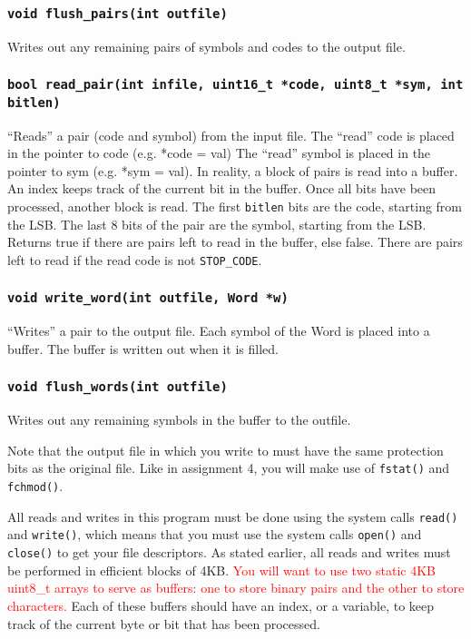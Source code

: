 \documentclass{article}
\begin{document}
\subsubsection{\texttt{void flush\_pairs(int outfile)}}
Writes out any remaining pairs of symbols and codes to the output file.

\subsubsection{\texttt{bool read\_pair(int infile, uint16\_t *code,
uint8\_t *sym, int bitlen)}}
``Reads'' a pair (code and symbol) from the input file.
The ``read'' code is placed in the pointer to code (e.g. *code = val)
The ``read'' symbol is placed in the pointer to sym (e.g. *sym = val).
In reality, a block of pairs is read into a buffer.  An index keeps
track of the current bit in the buffer.  Once all bits have been
processed, another block is read.  The first \texttt{bitlen} bits are
the code, starting from the LSB.  The last 8 bits of the pair are the
symbol, starting from the LSB.  Returns true if there are pairs left to
read in the buffer, else false.  There are pairs left to read if the
read code is not \texttt{STOP\_CODE}.

\subsubsection{\texttt{void write\_word(int outfile, Word *w)}}
``Writes'' a pair to the output file. Each symbol of the Word is placed
into a buffer. The buffer is written out when it is filled.

\subsubsection{\texttt{void flush\_words(int outfile)}}
Writes out any remaining symbols in the buffer to the outfile.

Note that the output file in which you write to must have the same
protection bits as the original file. Like in assignment 4, you will
make use of \texttt{fstat()} and \texttt{fchmod()}.

All reads and writes in this program must be done using the system calls
\texttt{read()} and \texttt{write()}, which means that you must use the
system calls \texttt{open()} and \texttt{close()} to get your file
descriptors. As stated earlier, all reads and writes must be performed
in efficient blocks of 4KB. \textcolor{red}{You will want to use two
static 4KB uint8\_t arrays to serve as buffers: one to store binary
pairs and the other to store characters.} Each of these buffers should
have an index, or a variable, to keep track of the current byte or bit
that has been processed.
\end{document}
